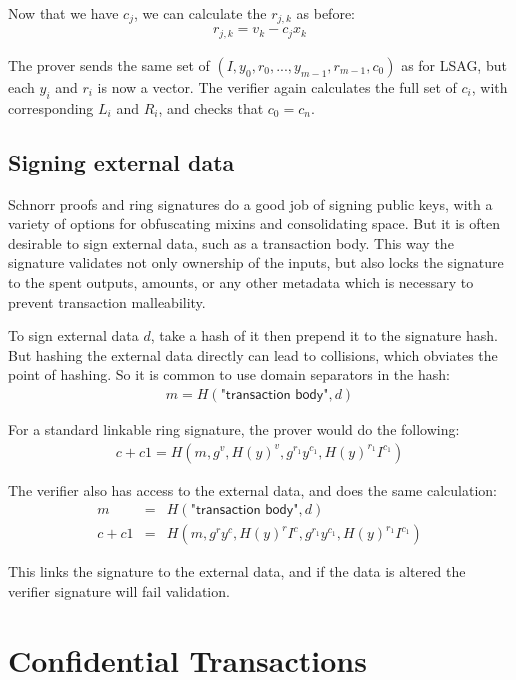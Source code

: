 \documentclass{article}
\begin{document}
Now that we have $c_j$, we can calculate the $r_{j,k}$ as before:
\begin{eqnarray}
  r_{j,k} = v_k - c_j x_k
\end{eqnarray}

The prover sends the same set of $(I, y_0, r_0, ..., y_{m-1}, r_{m-1}, c_0)$ as for LSAG, but each $y_i$ and $r_i$ is now a vector.  The verifier again calculates the full set of $c_i$, with corresponding $L_i$ and $R_i$, and checks that $c_0 = c_n$.


\subsection{Signing external data}

Schnorr proofs and ring signatures do a good job of signing public keys, with a variety of options for obfuscating mixins and consolidating space.  But it is often desirable to sign external data, such as a transaction body.  This way the signature validates not only ownership of the inputs, but also locks the signature to the spent outputs, amounts, or any other metadata which is necessary to prevent transaction malleability.

To sign external data $d$, take a hash of it then prepend it to the signature hash.  But hashing the external data directly can lead to collisions, which obviates the point of hashing.  So it is common to use domain separators in the hash:
\begin{eqnarray}
  m = H(\textsf{"transaction body"}, d)
\end{eqnarray}

For a standard linkable ring signature, the prover would do the following:
\begin{eqnarray}
  c + c1 = H(m, g^v, H(y)^v, g^{r_1} y^{c_1}, H(y)^{r_1} I^{c_1})
\end{eqnarray}

The verifier also has access to the external data, and does the same calculation:
\begin{eqnarray}
  m &=& H(\textsf{"transaction body"}, d)\\
  c+c1 &=& H(m, g^r y^c, H(y)^r I^c, g^{r_1} y^{c_1}, H(y)^{r_1} I^{c_1})
\end{eqnarray}

This links the signature to the external data, and if the data is altered the verifier signature will fail validation.



\section{Confidential Transactions}
\end{document}
